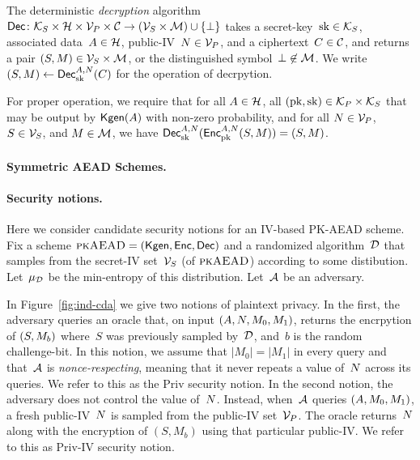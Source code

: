 The deterministic \emph{decryption} algorithm ${\mathsf{Dec}} \colon \mathcal{K}_S \times \mathcal{H} \times \mathcal{V}_P \times \mathcal{C} \to \left(\mathcal{V}_S \times \mathcal{M}\right) \cup \{\bot\}$ takes a secret-key~$\mathrm{sk}\in\mathcal{K}_S$, associated data~$A \in \mathcal{H}$, public-IV~$N \in \mathcal{V}_P$, and a ciphertext~$C \in \mathcal{C}$, and returns a pair $(S,M) \in \mathcal{V}_S\times\mathcal{M}$, or the distinguished symbol~$\bot \not\in \mathcal{M}$.  We write $(S,M) \gets {\mathsf{Dec}}_{\mathrm{sk}}^{A,N}(C)$ for the operation of decrpytion. 

For proper operation, we require that for all $A\in\mathcal{H}$, all $(\mathrm{pk},\mathrm{sk})\in\mathcal{K}_P\times\mathcal{K}_S$ that may be output by $\mathsf{Kgen}(A)$ with non-zero probability, and for all $N\in\mathcal{V}_P$, $S\in\mathcal{V}_S$, and $M\in\mathcal{M}$, we have ${\mathsf{Dec}}_{\mathrm{sk}}^{A,N}({\mathsf{Enc}}_{\mathrm{pk}}^{A,N}(S,M))=(S,M)$.


\paragraph{Symmetric AEAD Schemes. } 


\paragraph{Security notions. } 
Here we consider candidate security notions for an IV-based PK-AEAD scheme.  Fix a scheme $\textsc{pkAEAD}=(\mathsf{Kgen},{\mathsf{Enc}},{\mathsf{Dec}})$ and a randomized algorithm~${\cal D}$ that samples from the secret-IV set~$\mathcal{V}_S$ (of $\textsc{pkAEAD}$) according to some distibution.  Let~$\mu_{\cal D}$ be the min-entropy of this distribution.  Let~${\cal A}$ be an adversary.  

In Figure~\ref{fig:ind-cda} we give two notions of plaintext privacy.  In the first, the adversary queries an oracle that, on input $(A,N,M_0,M_1)$, returns the encrpytion of $(S,M_b)$ where~$S$ was previously sampled by~${\cal D}$, and~$b$ is the random challenge-bit.  In this notion, we assume that $|M_0|=|M_1|$ in every query and that~${\cal A}$ is \emph{nonce-respecting}, meaning that it never repeats a value of~$N$ across its queries.  We refer to this as the Priv security notion.
In the second notion, the adversary does not control the value of~$N$.  Instead, when~${\cal A}$ queries $(A,M_0,M_1)$, a fresh public-IV~$N$ is sampled from the public-IV set~$\mathcal{V}_P$.  The oracle returns~$N$ along with the encryption of $(S,M_b)$ using that particular public-IV.  We refer to this as Priv-IV security notion.

